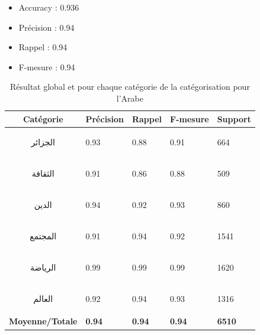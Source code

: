 \begin{itemize}
            \begin{itemize}
                \item{Accuracy : 0.936}
                \item{Précision : 0.94}
                \item{Rappel : 0.94}
                \item{F-mesure : 0.94}
            \end{itemize}
            \begin{table}[H]
                    \begin{center}
                        \begin{tabular}{|c|C{2cm}|C{2cm}|C{2cm}|C{2cm}|}
                            \hline
                            \textbf{Catégorie} &  \textbf{Précision} &  \textbf{Rappel} &  \textbf{F-mesure} &  \textbf{Support} \\
                            \hline
                            \begin{arab}الجزائر\end{arab} & 0.93 & 0.88 & 0.91 & 664 \\
                            \begin{arab}الثقافة\end{arab} & 0.91 & 0.86 & 0.88 & 509 \\
                            \begin{arab}الدين\end{arab} & 0.94 & 0.92 & 0.93 & 860 \\
                            \begin{arab}المجتمع\end{arab} & 0.91 & 0.94 & 0.92 & 1541 \\
                            \begin{arab}الرياضة\end{arab} & 0.99 & 0.99 & 0.99 & 1620 \\
                            \begin{arab}العالم\end{arab} & 0.92 & 0.94 & 0.93 & 1316 \\                      
                            \textbf{Moyenne/Totale} & \textbf{0.94} & \textbf{0.94} & \textbf{0.94} & \textbf{6510} \\
                            \hline
                        \end{tabular}
                    \end{center}
                    \caption{Résultat global et pour chaque catégorie de la catégorisation pour l'Arabe}
                \end{table}
        \end{itemize}

